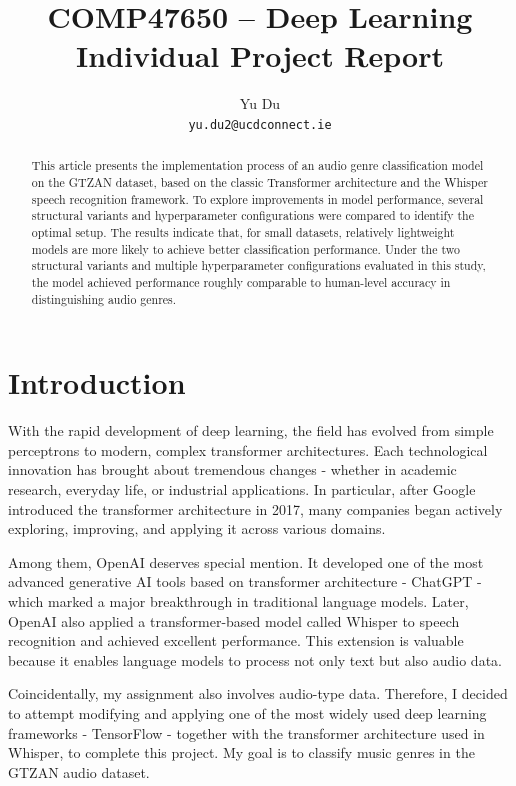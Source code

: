 \documentclass{article}
\title{COMP47650 – Deep Learning Individual Project Report}
\author{%
  Yu Du \\
  \texttt{yu.du2@ucdconnect.ie} \\
}
\date{}
\begin{document}
  \maketitle

  \begin{abstract}

    This article presents the implementation process of an audio genre classification model on the GTZAN dataset, based on the classic Transformer architecture and the Whisper speech recognition framework. To explore improvements in model performance, several structural variants and hyperparameter configurations were compared to identify the optimal setup. The results indicate that, for small datasets, relatively lightweight models are more likely to achieve better classification performance. Under the two structural variants and multiple hyperparameter configurations evaluated in this study, the model achieved performance roughly comparable to human-level accuracy in distinguishing audio genres.

  \end{abstract}

  \section{Introduction}

    With the rapid development of deep learning, the field has evolved from simple perceptrons to modern, complex transformer architectures. Each technological innovation has brought about tremendous changes - whether in academic research, everyday life, or industrial applications. In particular, after Google introduced the transformer architecture in 2017, many companies began actively exploring, improving, and applying it across various domains.

    Among them, OpenAI deserves special mention. It developed one of the most advanced generative AI tools based on transformer architecture - ChatGPT - which marked a major breakthrough in traditional language models. Later, OpenAI also applied a transformer-based model called Whisper to speech recognition and achieved excellent performance. This extension is valuable because it enables language models to process not only text but also audio data.
    
    Coincidentally, my assignment also involves audio-type data. Therefore, I decided to attempt modifying and applying one of the most widely used deep learning frameworks - TensorFlow - together with the transformer architecture used in Whisper, to complete this project. My goal is to classify music genres in the GTZAN audio dataset.
    
\end{document}
